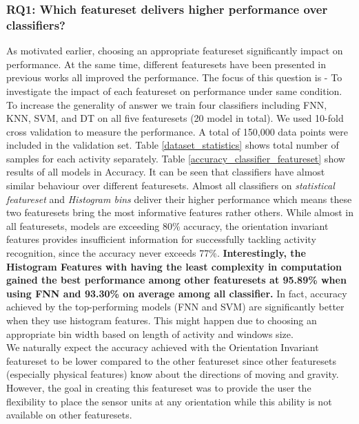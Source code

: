\documentclass[journal,article,submit,moreauthors,pdftex]{Definitions/mdpi}
\begin{document}
\subsubsection{RQ1: Which featureset delivers higher performance over classifiers?}
As motivated earlier, choosing an appropriate featureset significantly impact on performance. At the same time, different featuresets have been presented in previous works all improved the performance. The focus of this question is - To investigate the impact of each featureset on performance under same condition. To increase the generality of answer we train four classifiers including FNN, KNN, SVM, and DT on all five featuresets (20 model in total). We used 10-fold cross validation to measure the performance. A total of 150,000 data points were included in the validation set. Table \ref{dataset_statistics} shows total number of samples for each activity separately. Table \ref{accuracy_classifier_featureset} show results of all models in Accuracy. It can be seen that classifiers have almost similar behaviour over different featuresets. Almost all classifiers on \textit{statistical featureset} and \textit{Histogram bins} deliver their higher performance which means these two featuresets bring the most informative features rather others. While almost in all featuresets, models are exceeding 80\% accuracy, the orientation invariant features provides insufficient information for successfully tackling activity recognition, since the accuracy never exceeds 77\%. \textbf{Interestingly, the Histogram Features with having the least complexity in computation gained the best performance among other featuresets at 95.89\% when using FNN and 93.30\% on average among all classifier.} In fact, accuracy achieved by the top-performing models (FNN and SVM) are significantly better when they use histogram features. This might happen due to choosing an appropriate bin width based on length of activity and windows size.\\
We naturally expect the accuracy achieved with the Orientation Invariant featureset to be lower compared to the other featureset since other featuresets (especially physical features) know about the directions of moving and gravity. However, the goal in creating this featureset was to provide the user the flexibility to place the sensor units at any orientation while this ability is not available on other featuresets. 
\end{document}
